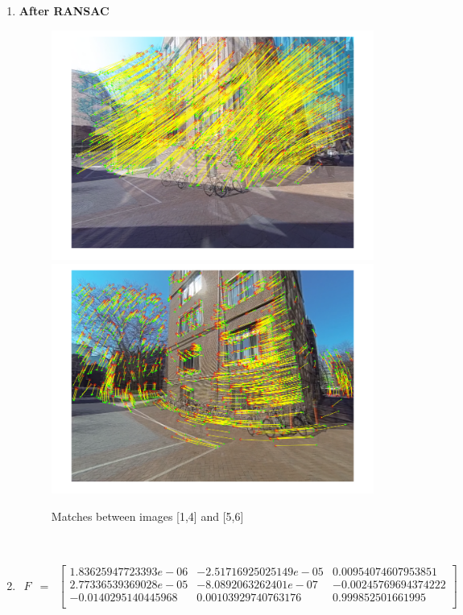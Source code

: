 \documentclass[10pt,letterpaper]{article}
\begin{document}
\begin{enumerate}[]

\item \textbf{After RANSAC}

\begin{figure}[h!]
 \center
  \includegraphics[width=5in]{../images/after_ransac1-2}
  \includegraphics[width=5in]{../images/after_ransac5-6}
  \caption
   {Matches between images [1,4] and [5,6]}
\end{figure} \\

\newpage

\item
\begin{eqnarray*}
F &=&
\begin{bmatrix}
      1.83625947723393e-06   &  -2.51716925025149e-05   &    0.00954074607953851 \\
      2.77336539369028e-05   &  -8.0892063262401e-07   &   -0.00245769694374222 \\
       -0.0140295140445968    &   0.00103929740763176     &    0.999852501661995 \\
\end{bmatrix}
\end{eqnarray*}


\end{enumerate}
\end{document}
